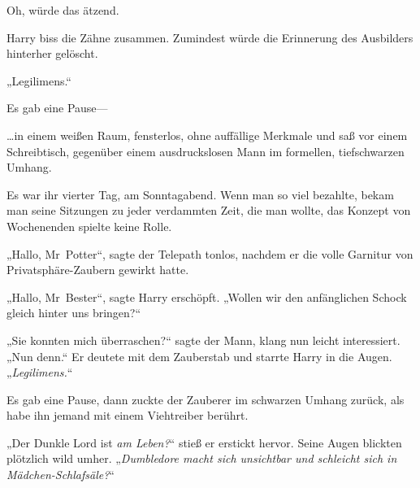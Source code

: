 Oh, würde das ätzend.

Harry biss die Zähne zusammen. Zumindest würde die Erinnerung des Ausbilders hinterher gelöscht.

„Legilimens.“

Es gab eine Pause—

\later

…in einem weißen Raum, fensterlos, ohne auffällige Merkmale und saß vor einem Schreibtisch, gegenüber einem ausdruckslosen Mann im formellen, tiefschwarzen Umhang.

Es war ihr vierter Tag, am Sonntagabend. Wenn man so viel bezahlte, bekam man seine Sitzungen zu jeder verdammten Zeit, die man wollte, das Konzept von Wochenenden spielte keine Rolle.

„Hallo, Mr~Potter“, sagte der Telepath tonlos, nachdem er die volle Garnitur von Privatsphäre-Zaubern gewirkt hatte.

„Hallo, Mr~Bester“, sagte Harry erschöpft. „Wollen wir den anfänglichen Schock gleich hinter uns bringen?“

„Sie konnten mich überraschen?“ sagte der Mann, klang nun leicht interessiert. „Nun denn.“ Er deutete mit dem Zauberstab und starrte Harry in die Augen. „\emph{Legilimens.}“

Es gab eine Pause, dann zuckte der Zauberer im schwarzen Umhang zurück, als habe ihn jemand mit einem Viehtreiber berührt.

„Der Dunkle Lord ist \emph{am Leben?}“ stieß er erstickt hervor. Seine Augen blickten plötzlich wild umher. „\emph{Dumbledore macht sich unsichtbar und schleicht sich in Mädchen-Schlafsäle?}“

